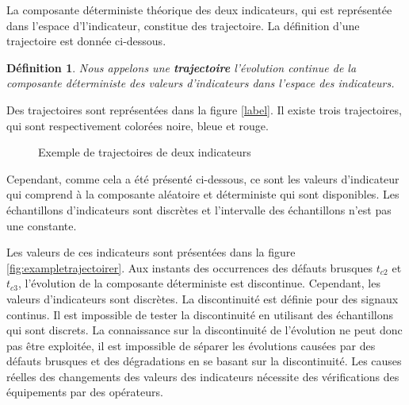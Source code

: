\documentclass{article}
\newtheorem{definition}{Définition}
\begin{document}
La composante déterministe théorique  des deux indicateurs, qui est représentée dans l'espace d'l'indicateur, constitue des trajectoire. 
La définition d'une trajectoire est donnée ci-dessous. 
\begin{definition}
	Nous appelons une \textbf{trajectoire} l'évolution continue de la composante déterministe des valeurs d'indicateurs dans l'espace des indicateurs.
\end{definition}

Des trajectoires sont représentées dans la figure \ref{label}. 
Il existe trois trajectoires, qui sont respectivement colorées noire, bleue et rouge.  

\begin{figure}[H]
	\centering
	\caption{Exemple de trajectoires de deux indicateurs}
	\label{fig:trajectoiremu}
\end{figure}

Cependant, comme cela a été présenté ci-dessous, ce sont les valeurs d'indicateur qui comprend à la composante aléatoire et déterministe qui sont disponibles.
Les échantillons d'indicateurs sont discrètes et l'intervalle des échantillons n'est pas une constante. 

Les valeurs de ces indicateurs sont présentées dans la figure \ref{fig:exampletrajectoirer}.
Aux instants des occurrences des défauts brusques $t_{c2}$ et $t_{c3}$, l'évolution de la composante déterministe est discontinue. 
Cependant, les valeurs d'indicateurs sont discrètes. 
La discontinuité est définie pour des signaux continus.
Il est impossible de tester la discontinuité en utilisant des échantillons qui sont discrets.
La connaissance sur la discontinuité de l'évolution ne peut donc pas être exploitée, il est impossible de séparer les évolutions causées par des défauts brusques et des dégradations en se basant sur la discontinuité.
Les causes réelles des changements des valeurs des indicateurs nécessite des vérifications des équipements par des opérateurs.
\end{document}
